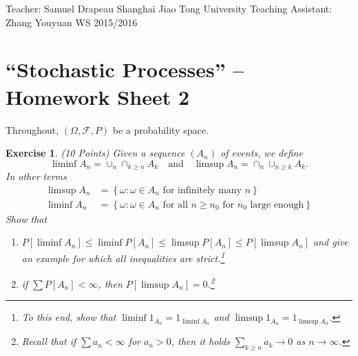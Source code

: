 \documentclass[DIV=classic,a4paper,10pt]{scrartcl}
\newtheorem{exercise}[theorem]{Exercise}
\theoremstyle{nonumberplain}
\numberwithin{equation}{section}
\begin{document}
\noindent
Teacher: Samuel Drapeau \hfill Shanghai Jiao Tong University \newline
Teaching Assistant: Zhang Youyuan \hfill WS 2015/2016

\smallskip
\noindent
\hrulefill

\smallskip

\setcounter{section}{2}

\pagestyle{empty}


\section*{``Stochastic Processes'' -- Homework Sheet 2}
\thispagestyle{empty}



Throughout, $(\Omega,\mathcal{F},P)$ be a probability space.

\begin{exercise}(10 Points)
    Given a sequence $(A_n)$ of events, we define
    \begin{equation*}
        \liminf A_n=\cup_n \cap _{k\geq n}A_k\quad \text{and}\quad \limsup A_n =\cap_n\cup_{n\geq k}A_k.
    \end{equation*}
    In other terms 
    \begin{align*}
        \limsup A_n &=\left\{ \omega\colon \omega \in A_n\text{ for infinitely many }n\right\} \\
        \liminf A_n &=\left\{ \omega\colon \omega \in A_n\text{ for all }n\geq n_0 \text{ for } n_0\text{ large enough}\right\} 
    \end{align*}
    Show that
    \begin{enumerate}[label=\textit{(\alph*)}]
        \item $P[\liminf A_n]\leq \liminf P[A_n]\leq \limsup P[A_n]\leq P[\limsup A_n]$ and give an example for which all inequalities are strict.\footnote{To this end, show that $\liminf 1_{A_n}=1_{\liminf A_n}$ and $\limsup 1_{A_n}=1_{\limsup A_n}$.}
        \item if $\sum P[A_n]<\infty$, then $P[\limsup A_n]=0$.\footnote{Recall that if $\sum a_n <\infty$ for $a_n>0$, then it holds $\sum_{k\geq n}a_k\to 0$ as $n\to \infty$.}
    \end{enumerate}
\end{exercise}
\end{document}

